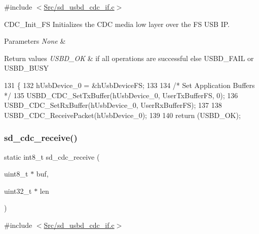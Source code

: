 {\ttfamily \#include $<$\mbox{\hyperlink{sd__usbd__cdc__if_8c}{Src/sd\+\_\+usbd\+\_\+cdc\+\_\+if.\+c}}$>$}



C\+D\+C\+\_\+\+Init\+\_\+\+FS Initializes the C\+DC media low layer over the FS U\+SB IP. 


\begin{DoxyParams}{Parameters}
{\em None} & \\
\hline
\end{DoxyParams}

\begin{DoxyRetVals}{Return values}
{\em U\+S\+B\+D\+\_\+\+OK} & if all operations are successful else U\+S\+B\+D\+\_\+\+F\+A\+IL or U\+S\+B\+D\+\_\+\+B\+U\+SY \\
\hline
\end{DoxyRetVals}

\begin{DoxyCode}
131 \{
132     hUsbDevice\_0 = &hUsbDeviceFS;
133     
134     \textcolor{comment}{/* Set Application Buffers */}
135     USBD\_CDC\_SetTxBuffer(hUsbDevice\_0, UserTxBufferFS, 0);
136     USBD\_CDC\_SetRxBuffer(hUsbDevice\_0, UserRxBufferFS);
137   
138     USBD\_CDC\_ReceivePacket(hUsbDevice\_0);
139 
140     \textcolor{keywordflow}{return} (USBD\_OK);
\end{DoxyCode}
\mbox{\label{group___s_d___u_s_b___c_d_c___i_f___functions_ga5da74bc52d86c1f85d057f7df7d7674a}} 
\subsubsection{\texorpdfstring{sd\+\_\+cdc\+\_\+receive()}{sd\_cdc\_receive()}}
{\footnotesize\ttfamily static int8\+\_\+t sd\+\_\+cdc\+\_\+receive (\begin{DoxyParamCaption}\item[{uint8\+\_\+t $\ast$}]{buf,  }\item[{uint32\+\_\+t $\ast$}]{len }\end{DoxyParamCaption})\hspace{0.3cm}{\ttfamily [static]}}



{\ttfamily \#include $<$\mbox{\hyperlink{sd__usbd__cdc__if_8c}{Src/sd\+\_\+usbd\+\_\+cdc\+\_\+if.\+c}}$>$}



